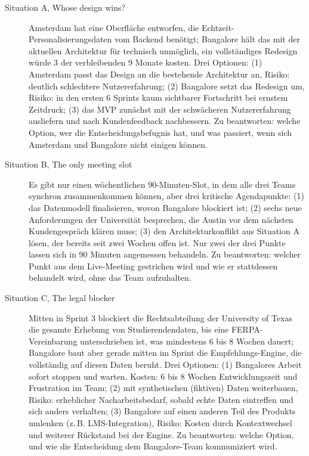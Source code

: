\begin{description}
    \item[Situation A, Whose design wins?] Amsterdam hat eine Oberfläche entworfen, die
    Echtzeit-Personalisierungsdaten vom Backend benötigt; Bangalore hält das mit der aktuellen
    Architektur für technisch unmöglich, ein vollständiges Redesign würde 3 der verbleibenden 9
    Monate kosten. Drei Optionen: (1) Amsterdam passt das Design an die bestehende Architektur an,
    Risiko: deutlich schlechtere Nutzererfahrung; (2) Bangalore setzt das Redesign um, Risiko: in
    den ersten 6 Sprints kaum sichtbarer Fortschritt bei ernstem Zeitdruck; (3) das MVP zunächst mit
    der schwächeren Nutzererfahrung ausliefern und nach Kundenfeedback nachbessern. Zu beantworten:
    welche Option, wer die Entscheidungsbefugnis hat, und was passiert, wenn sich Amsterdam und
    Bangalore nicht einigen können.
    \item[Situation B, The only meeting slot] Es gibt nur einen wöchentlichen 90-Minuten-Slot, in
    dem alle drei Teams synchron zusammenkommen können, aber drei kritische Agendapunkte: (1) das
    Datenmodell finalisieren, wovon Bangalore blockiert ist; (2) sechs neue Anforderungen der
    Universität besprechen, die Austin vor dem nächsten Kundengespräch klären muss; (3) den
    Architekturkonflikt aus Situation A lösen, der bereits seit zwei Wochen offen ist. Nur zwei der
    drei Punkte lassen sich in 90 Minuten angemessen behandeln. Zu beantworten: welcher Punkt
    aus dem Live-Meeting gestrichen wird und wie er stattdessen behandelt wird, ohne das Team
    aufzuhalten.
    \item[Situation C, The legal blocker] Mitten in Sprint 3 blockiert die Rechtsabteilung der
    University of Texas die gesamte Erhebung von Studierendendaten, bis eine FERPA-Vereinbarung
    unterschrieben ist, was mindestens 6 bis 8 Wochen dauert; Bangalore baut aber gerade mitten im
    Sprint die Empfehlungs-Engine, die vollständig auf diesen Daten beruht. Drei Optionen: (1)
    Bangalores Arbeit sofort stoppen und warten, Kosten: 6 bis 8 Wochen Entwicklungszeit und
    Frustration im Team; (2) mit synthetischen (fiktiven) Daten weiterbauen, Risiko: erheblicher
    Nacharbeitsbedarf, sobald echte Daten eintreffen und sich anders verhalten; (3) Bangalore auf
    einen anderen Teil des Produkts umlenken (z.\,B. LMS-Integration), Risiko: Kosten durch
    Kontextwechsel und weiterer Rückstand bei der Engine. Zu beantworten: welche Option, und wie
    die Entscheidung dem Bangalore-Team kommuniziert wird.
\end{description}

